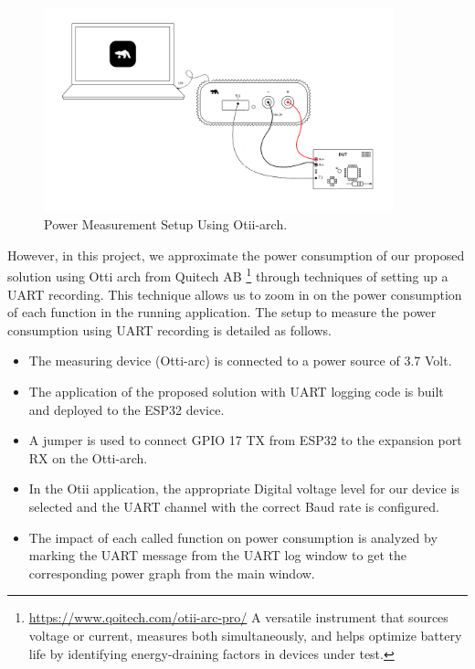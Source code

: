 \begin{figure}
    \centering
    \includegraphics[width=0.9\textwidth]{images/fp/otii-uart-log.png}
    \caption{Power Measurement Setup Using Otii-arch.}
    \label{fig:otii-pow}
\end{figure}
However, in this project, we approximate the power consumption of our proposed solution using Otti arch from Quitech AB \footnote{\url{https://www.qoitech.com/otii-arc-pro/} A versatile instrument that sources voltage or current, measures both simultaneously, and helps optimize battery life by identifying energy-draining factors in devices under test.} through techniques of setting up a UART recording. This technique allows us to zoom in on the power consumption of each function in the running application. The setup to measure the power consumption using UART recording is detailed as follows.
\begin{itemize}
    \item The measuring device (Otti-arc) is connected to a power source of 3.7 Volt. 
    \item The application of the proposed solution with UART logging code is built and deployed to the ESP32 device. 
    \item A jumper is used to connect GPIO 17 TX from ESP32 to the expansion port RX on the Otti-arch. 
    \item In the Otii application, the appropriate Digital voltage level for our device is selected and the UART channel with  the correct Baud rate is configured.
    \item The impact of each called function on power consumption is analyzed by marking the UART message from the UART log window to get the corresponding power graph from the main window. 
\end{itemize}




